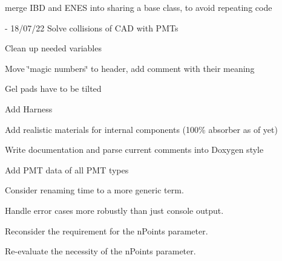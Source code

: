 \begin{DoxyRefList}
merge IBD and ENES into sharing a base class, to avoid repeating code  
\item[File \mbox{\hyperlink{_o_m_sim_l_o_m18_8cc}{OMSim\+LOM18.cc}} ]\label{todo__todo000006}%
%
-\/ 18/07/22 Solve collisions of CAD with PMTs
\begin{DoxyItemize}
\item Clean up needed variables
\item Move \char`\"{}magic numbers\char`\"{} to header, add comment with their meaning
\item Gel pads have to be tilted
\item Add Harness
\item Add realistic materials for internal components (100\% absorber as of yet)
\item Write documentation and parse current comments into Doxygen style  
\end{DoxyItemize}
\item[Member \mbox{\hyperlink{class_o_m_sim_p_m_t_response_a0dd544847ff216a24aa8c528e76c9aed}{OMSim\+PMTResponse\+::create\+Histogram\+From\+Data}} (const std\+::string \&p\+File\+Path, const char $\ast$p\+TH2\+DName)]\label{todo__todo000002}%
%
Add PMT data of all PMT types  
\item[Member \mbox{\hyperlink{class_o_m_sim_s_n_tools_aa760cb3204e636696ce5be962409694e}{OMSim\+SNTools\+::findtime}} (G4double time, std\+::vector$<$ G4double $>$ timearray)]\label{todo__todo000015}%
%
Consider renaming \textquotesingle{}time\textquotesingle{} to a more generic term.  
\item[Member \mbox{\hyperlink{class_o_m_sim_s_n_tools_a89a22f20d0aff91704cf6cab1b48d266}{OMSim\+SNTools\+::get\+File\+Names}} (int value)]\label{todo__todo000012}%
%
Handle error cases more robustly than just console output.  
\item[Member \mbox{\hyperlink{class_o_m_sim_s_n_tools_acd2197f87f712d54eff8e93b233e8478}{OMSim\+SNTools\+::Inverse\+Cumul}} (std\+::vector$<$ G4double $>$ xvals, std\+::vector$<$ G4double $>$ yvals, G4int n\+Points)]\label{todo__todo000013}%
%
Reconsider the requirement for the \textquotesingle{}n\+Points\textquotesingle{} parameter.  
\item[Member \mbox{\hyperlink{class_o_m_sim_s_n_tools_a296fba8cceca9892ab52ac9e18064b01}{OMSim\+SNTools\+::Inverse\+Cumul\+Algorithm}} (std\+::vector$<$ G4double $>$ x, std\+::vector$<$ G4double $>$ f, std\+::vector$<$ G4double $>$ a, std\+::vector$<$ G4double $>$ Fc, G4int n\+Points)]\label{todo__todo000014}%
%
Re-\/evaluate the necessity of the \textquotesingle{}n\+Points\textquotesingle{} parameter. 
\end{DoxyRefList}